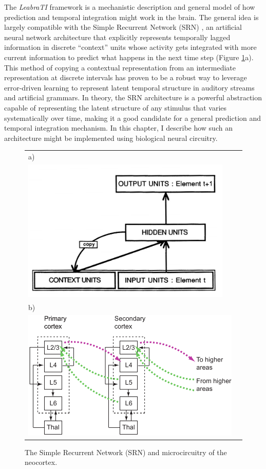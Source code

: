 \documentclass[defaultstyle,12pt]{thesis}
\begin{document}
{The \textit{LeabraTI} framework is a mechanistic description and general model of how prediction and temporal integration might work in the brain. The general idea is largely compatible with the Simple Recurrent Network (SRN) \cite{Elman90,Servan-SchreiberCleeremansMcClelland91}, an artificial neural network architecture that explicitly represents temporally lagged information in discrete ``context'' units whose activity gets integrated with more current information to predict what happens in the next time step (Figure \ref{fig:srn_circuit}a). This method of copying a contextual representation from an intermediate representation at discrete intervals has proven to be a robust way to leverage error-driven learning to represent latent temporal structure in auditory streams and artificial grammars. In theory, the SRN architecture is a powerful abstraction capable of representing the latent structure of any stimulus that varies systematically over time, making it a good candidate for a general prediction and temporal integration mechanism. In this chapter, I describe how such an architecture might be implemented using biological neural circuitry.

\begin{figure}[hp]
\centering
\begin{tabular}{ll}
a) \\
\includegraphics[width=100mm]{srn_scm.png} \\
b) \\
\includegraphics[width=120mm]{microcircuit_horiz.pdf} \\
\end{tabular}
\caption{The Simple Recurrent Network (SRN) and microcircuitry of the neocortex.}
\label{fig:srn_circuit}
\end{figure}

}
\end{document}
